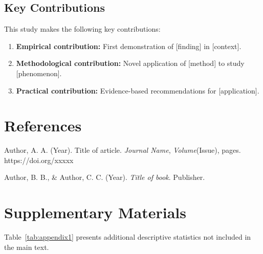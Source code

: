 \documentclass[11pt,letterpaper]{report}
\begin{document}
\section{Key Contributions}

\begin{keyfindings}
This study makes the following key contributions:
\begin{enumerate}
    \item \textbf{Empirical contribution:} First demonstration of [finding] in [context].
    \item \textbf{Methodological contribution:} Novel application of [method] to study [phenomenon].
    \item \textbf{Practical contribution:} Evidence-based recommendations for [application].
\end{enumerate}
\end{keyfindings}


\chapter*{References}

% 
% 

\noindent
\hangindent=0.5in Author, A. A. (Year). Title of article. \textit{Journal Name}, \textit{Volume}(Issue), pages. https://doi.org/xxxxx

\vspace{0.5em}
\noindent
\hangindent=0.5in Author, B. B., \& Author, C. C. (Year). \textit{Title of book}. Publisher.


\appendix

\chapter{Supplementary Materials}


Table~\ref{tab:appendix1} presents additional descriptive statistics not included in the main text.
\end{document}
